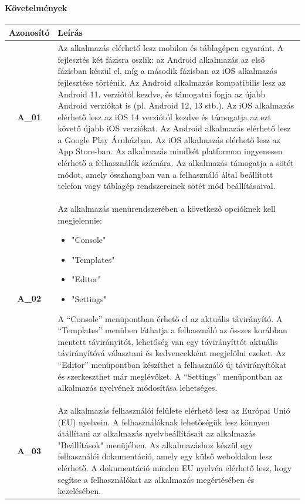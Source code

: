 \documentclass{article}
\begin{document}
\paragraph{Követelmények}
\begingroup
\centering
\begin{longtable}{|c|p{14cm}|}
\hline
\textbf{Azonosító} & \textbf{Leírás}        \\ 
\hline
       \textbf{A\_01}  & Az alkalmazás elérhető lesz mobilon és táblagépen egyaránt. A fejlesztés két fázisra oszlik: az Android alkalmazás az első fázisban készül el, míg a második fázisban az iOS alkalmazás fejlesztése történik. Az Android alkalmazás kompatibilis lesz az Android 11. verziótól kezdve, és támogatni fogja az újabb Android verziókat is (pl. Android 12, 13 stb.). Az iOS alkalmazás elérhető lesz az iOS 14 verziótól kezdve és támogatja az ezt követő újabb iOS verziókat. Az Android alkalmazás elérhető lesz a Google Play Áruházban. Az iOS alkalmazás elérhető lesz az App Store-ban. Az alkalmazás mindkét platformon ingyenesen elérhető a felhasználók számára. Az alkalmazás támogatja a sötét módot, amely összhangban van a felhasználó által beállított telefon vagy táblagép rendszereinek sötét mód beállításaival. \\\hline
       
       \textbf{A\_02}  & Az alkalmazás menürendszerében a következő opcióknek kell megjelennie:
       \begin{itemize}
       \item "Console"
       \item "Templates"
       \item "Editor"
       \item "Settings"
       \end{itemize}
       A “Console” menüpontban érhető el az aktuális távirányító. A “Templates” menüben láthatja a felhasználó az összes korábban mentett távirányítót, lehetőség van egy távirányíttót aktuális távirányítóvá választani és kedvencekként megjelölni ezeket. Az “Editor” menüpontban készíthet a felhasználó új távirányítókat és  szerkeszthet már meglévőket. A “Settings” menüpontban az alkalmazás nyelvének módosítása lehetséges. \\\hline
       
       \textbf{A\_03}  & Az alkalmazás felhasználói felülete elérhető lesz az Európai Unió (EU) nyelvein. A felhasználóknak lehetőségük lesz könnyen átállítani az alkalmazás nyelvbeállításait az alkalmazás "Beállítások" menüjében. Az alkalmazáshoz készül egy felhasználói dokumentáció, amely egy külső weboldalon lesz elérhető. A dokumentáció minden EU nyelvén elérhető lesz, hogy segítse a felhasználókat az alkalmazás megértésében és kezelésében.  \\\hline
       

\end{longtable}
\end{document}
